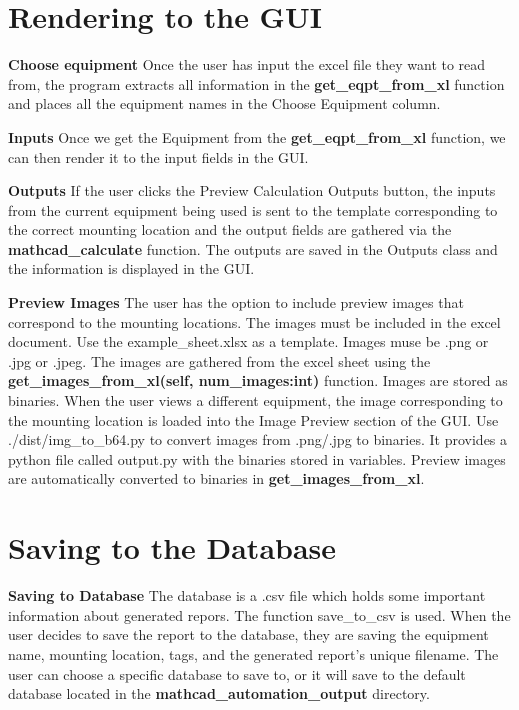 \documentclass[11pt]{article}
\begin{document}
\section{Rendering to the GUI}
\label{sec:org9644cf4}
\textbf{Choose equipment}
    Once the user has input the excel file they want to read from, the program extracts all information in the \textbf{get\_eqpt\_from\_xl} function and places all the equipment names in the Choose Equipment column.

\textbf{Inputs}
    Once we get the Equipment from the \textbf{get\_eqpt\_from\_xl} function, we can then render it to the input fields in the GUI.

\textbf{Outputs}
    If the user clicks the Preview Calculation Outputs button, the inputs from the current equipment being used is sent to the template corresponding to the correct mounting location and the output fields are gathered via the \textbf{mathcad\_calculate} function. The outputs are saved in the Outputs class and the information is displayed in the GUI.

\textbf{Preview Images}
    The user has the option to include preview images that correspond to the mounting locations. The images must be included in the excel document. Use the example\_sheet.xlsx as a template. Images muse be .png or .jpg or .jpeg. The images are gathered from the excel sheet using the \textbf{get\_images\_from\_xl(self, num\_images:int)} function. Images are stored as binaries. When the user views a different equipment, the image corresponding to the mounting location is loaded into the Image Preview section of the GUI. Use ./dist/img\_to\_b64.py to convert images from .png/.jpg to binaries. It provides a python file called output.py with the binaries stored in variables. Preview images are automatically converted to binaries in \textbf{get\_images\_from\_xl}.

\section{Saving to the Database}
\label{sec:orgf23af58}

\textbf{Saving to Database}
    The database is a .csv file which holds some important information about generated repors. The function save\_to\_csv is used. When the user decides to save the report to the database, they are saving the equipment name, mounting location, tags, and the generated report's unique filename. The user can choose a specific database to save to, or it will save to the default database located in the \textbf{mathcad\_automation\_output} directory.
\end{document}
